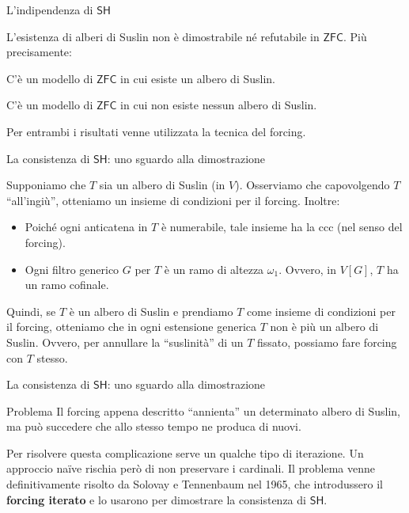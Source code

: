\documentclass{beamer}
\theoremstyle{num.custom-title}
\theoremstyle{custom-title}
\newcommand{\ZFC}{\ensuremath{\mathsf{ZFC}}\xspace}
\newcommand{\SH}{\ensuremath{\mathsf{SH}}\xspace}
\renewcommand{\emph}[1]{\textbf{#1}}
\begin{document}
\begin{frame}{L'indipendenza di \SH}

L'esistenza di alberi di Suslin non è dimostrabile né refutabile in \ZFC. Più precisamente:

\begin{theorem}[Tennenbaum, 1963]
C'è un modello di \ZFC in cui esiste un albero di Suslin.
\end{theorem}

\begin{theorem}
C'è un modello di \ZFC in cui non esiste nessun albero di Suslin.
\end{theorem}

Per entrambi i risultati venne utilizzata la tecnica del forcing.

\end{frame}


\begin{frame}{La consistenza di \SH: uno sguardo alla dimostrazione}

Supponiamo che $T$ sia un albero di Suslin (in $V$). Osserviamo che capovolgendo $T$ ``all'ingiù'', otteniamo un insieme di condizioni per il forcing. Inoltre:
\begin{itemize}
\item  Poiché ogni anticatena in $T$ è numerabile, tale insieme ha la ccc (nel senso del forcing).
\item Ogni filtro generico $G$ per $T$ è un ramo di altezza $\omega_1$. Ovvero, in $V[G]$, $T$ ha un ramo cofinale.
\end{itemize}

Quindi, se $T$ è un albero di Suslin e prendiamo $T$ come insieme di condizioni per il forcing, otteniamo che in ogni estensione generica $T$ non è più un albero di Suslin. Ovvero, per annullare la ``suslinità'' di un $T$ fissato, possiamo fare forcing con $T$ stesso.

\end{frame}


\begin{frame}{La consistenza di \SH: uno sguardo alla dimostrazione}

\begin{alertblock}{Problema}
Il forcing appena descritto ``annienta'' un determinato albero di Suslin, ma può succedere che allo stesso tempo ne produca di nuovi.
\end{alertblock}

Per risolvere questa complicazione serve un qualche tipo di iterazione. Un approccio naïve rischia però di non preservare i cardinali. Il problema venne definitivamente risolto da Solovay e Tennenbaum nel 1965, che introdussero il \emph{forcing iterato} e lo usarono per dimostrare la consistenza di \SH.

\end{frame}
\end{document}
